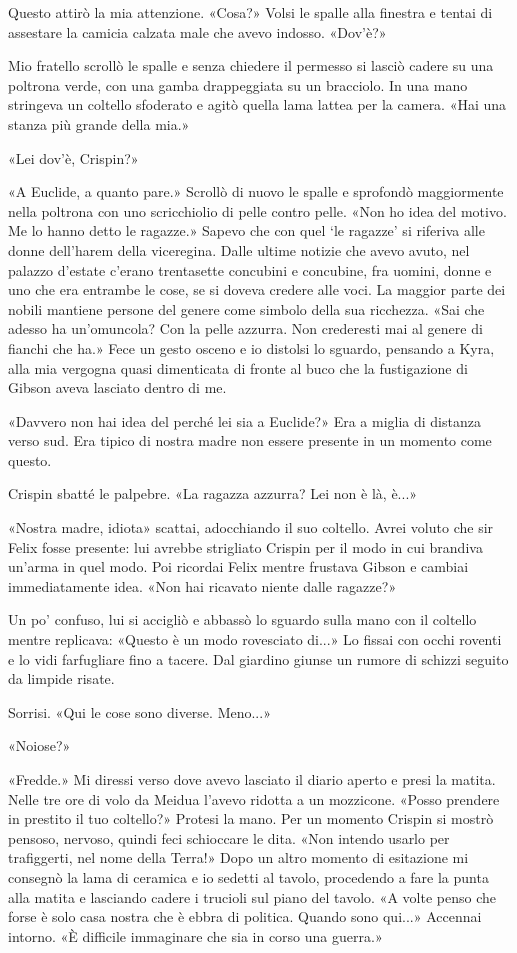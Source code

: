 Questo attirò la mia attenzione. «Cosa?» Volsi le spalle alla finestra e
tentai di assestare la camicia calzata male che avevo indosso. «Dov'è?»

Mio fratello scrollò le spalle e senza chiedere il permesso si lasciò
cadere su una poltrona verde, con una gamba drappeggiata su un
bracciolo. In una mano stringeva un coltello sfoderato e agitò quella
lama lattea per la camera. «Hai una stanza più grande della mia.»

«Lei dov'è, Crispin?»

«A Euclide, a quanto pare.» Scrollò di nuovo le spalle e sprofondò
maggiormente nella poltrona con uno scricchiolio di pelle contro pelle.
«Non ho idea del motivo. Me lo hanno detto le ragazze.» Sapevo che con
quel `le ragazze' si riferiva alle donne dell'harem della viceregina.
Dalle ultime notizie che avevo avuto, nel palazzo d'estate c'erano
trentasette concubini e concubine, fra uomini, donne e uno che era
entrambe le cose, se si doveva credere alle voci. La maggior parte dei
nobili mantiene persone del genere come simbolo della sua ricchezza.
«Sai che adesso ha un'omuncola? Con la pelle azzurra. Non crederesti mai
al genere di fianchi che ha.» Fece un gesto osceno e io distolsi lo
sguardo, pensando a Kyra, alla mia vergogna quasi dimenticata di fronte
al buco che la fustigazione di Gibson aveva lasciato dentro di me.

«Davvero non hai idea del perché lei sia a Euclide?» Era a miglia di
distanza verso sud. Era tipico di nostra madre non essere presente in un
momento come questo.

Crispin sbatté le palpebre. «La ragazza azzurra? Lei non è là, è...»

«Nostra madre, idiota» scattai, adocchiando il suo coltello. Avrei
voluto che sir Felix fosse presente: lui avrebbe strigliato Crispin per
il modo in cui brandiva un'arma in quel modo. Poi ricordai Felix mentre
frustava Gibson e cambiai immediatamente idea. «Non hai ricavato niente
dalle ragazze?»

Un po' confuso, lui si accigliò e abbassò lo sguardo sulla mano con il
coltello mentre replicava: «Questo è un modo rovesciato di...» Lo fissai
con occhi roventi e lo vidi farfugliare fino a tacere. Dal giardino
giunse un rumore di schizzi seguito da limpide risate.

Sorrisi. «Qui le cose sono diverse. Meno...»

«Noiose?»

«Fredde.» Mi diressi verso dove avevo lasciato il diario aperto e presi
la matita. Nelle tre ore di volo da Meidua l'avevo ridotta a un
mozzicone. «Posso prendere in prestito il tuo coltello?» Protesi la
mano. Per un momento Crispin si mostrò pensoso, nervoso, quindi feci
schioccare le dita. «Non intendo usarlo per trafiggerti, nel nome della
Terra!» Dopo un altro momento di esitazione mi consegnò la lama di
ceramica e io sedetti al tavolo, procedendo a fare la punta alla matita
e lasciando cadere i trucioli sul piano del tavolo. «A volte penso che
forse è solo casa nostra che è ebbra di politica. Quando sono qui...»
Accennai intorno. «È difficile immaginare che sia in corso una guerra.»


